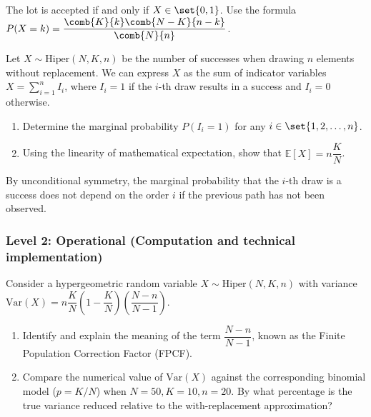 \begin{sugerencia}
	The lot is accepted if and only if $X \in \set{0, 1}$. Use the formula $P(X=k) = \dfrac{\comb{K}{k}\comb{N-K}{n-k}}{\comb{N}{n}}$.
\end{sugerencia}

\begin{problema}
	\label{prob:3.6.3}
	Let $X \sim \text{Hiper}(N, K, n)$ be the number of successes when drawing $n$ elements without replacement. We can express $X$ as the sum of indicator variables $X = \sum_{i=1}^n I_i$, where $I_i = 1$ if the $i$-th draw results in a success and $I_i = 0$ otherwise.
	\begin{enumerate}
		\item Determine the marginal probability $P(I_i = 1)$ for any $i \in \set{1, 2, \dots, n}$.
		\item Using the linearity of mathematical expectation, show that $\mathbb{E}[X] = n \dfrac{K}{N}$.
	\end{enumerate}
\end{problema}

\begin{sugerencia}
	By unconditional symmetry, the marginal probability that the $i$-th draw is a success does not depend on the order $i$ if the previous path has not been observed.
\end{sugerencia}

\subsubsection*{Level 2: Operational (Computation and technical implementation)}

\begin{problema}
	\label{prob:3.6.4}
	Consider a hypergeometric random variable $X \sim \text{Hiper}(N, K, n)$ with variance $\text{Var}(X) = n \dfrac{K}{N} \left(1 - \dfrac{K}{N}\right) \left(\dfrac{N-n}{N-1}\right)$.
	\begin{enumerate}
		\item Identify and explain the meaning of the term $\dfrac{N-n}{N-1}$, known as the Finite Population Correction Factor (FPCF).
		\item Compare the numerical value of $\text{Var}(X)$ against the corresponding binomial model ($p = K/N$) when $N=50, K=10, n=20$. By what percentage is the true variance reduced relative to the with-replacement approximation?
	\end{enumerate}
\end{problema}

